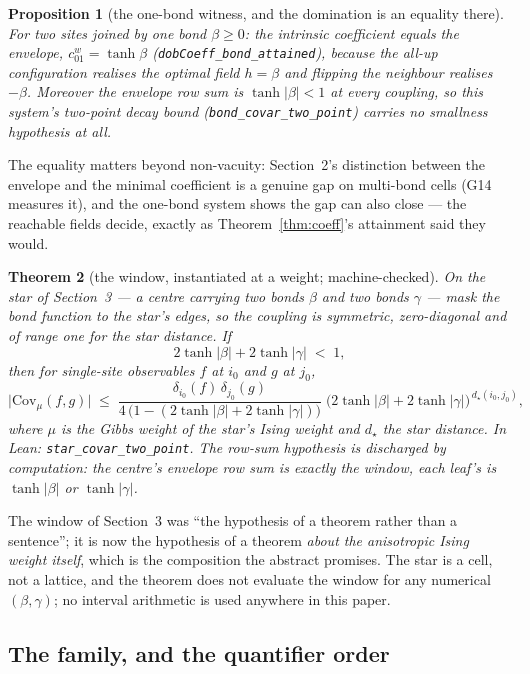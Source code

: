 \documentclass[11pt]{article}
\newtheorem{theorem}{Theorem}[section]
\newtheorem{proposition}[theorem]{Proposition}
\theoremstyle{definition}
\begin{document}
\begin{proposition}[the one-bond witness, and the domination is an equality
there]
\label{prop:ising-witness}
For two sites joined by one bond $\beta\ge0$: the intrinsic coefficient
\emph{equals} the envelope, $c^{w}_{01}=\tanh\beta$
(\texttt{dobCoeff\_bond\_attained}), because the all-up configuration
realises the optimal field $h=\beta$ and flipping the neighbour realises
$-\beta$.  Moreover the envelope row sum is $\tanh|\beta|<1$ at \emph{every}
coupling, so this system's two-point decay bound
(\texttt{bond\_covar\_two\_point}) carries no smallness hypothesis at all.
\end{proposition}

The equality matters beyond non-vacuity: Section~2's distinction between the
envelope and the minimal coefficient is a genuine gap on multi-bond cells
(G14 measures it), and the one-bond system shows the gap can also close ---
the reachable fields decide, exactly as Theorem~\ref{thm:coeff}'s attainment
said they would.

\begin{theorem}[the window, instantiated at a weight; machine-checked]
\label{thm:star}
On the star of Section~3 --- a centre carrying two bonds $\beta$ and two
bonds $\gamma$ --- mask the bond function to the star's edges, so the
coupling is symmetric, zero-diagonal and of range one for the star distance.
If
\[
  2\tanh|\beta|+2\tanh|\gamma|\;<\;1,
\]
then for single-site observables $f$ at $i_0$ and $g$ at $j_0$,
\[
  \bigl|\mathrm{Cov}_{\mu}(f,g)\bigr|\;\le\;
  \frac{\delta_{i_0}(f)\,\delta_{j_0}(g)}
       {4\,\bigl(1-(2\tanh|\beta|+2\tanh|\gamma|)\bigr)}
  \;\bigl(2\tanh|\beta|+2\tanh|\gamma|\bigr)^{\,d_\star(i_0,j_0)} ,
\]
where $\mu$ is the Gibbs weight of the star's Ising weight and $d_\star$ the
star distance.  In Lean: \texttt{star\_covar\_two\_point}.  The row-sum
hypothesis is discharged by computation: the centre's envelope row sum is
exactly the window, each leaf's is $\tanh|\beta|$ or $\tanh|\gamma|$.
\end{theorem}

The window of Section~3 was ``the hypothesis of a theorem rather than a
sentence''; it is now the hypothesis of a theorem \emph{about the anisotropic
Ising weight itself}, which is the composition the abstract promises.  The
star is a cell, not a lattice, and the theorem does not evaluate the window
for any numerical $(\beta,\gamma)$; no interval arithmetic is used anywhere
in this paper.

\subsection*{The family, and the quantifier order}
\end{document}
